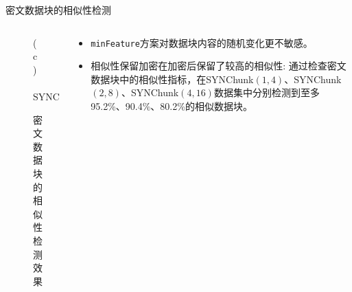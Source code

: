 \documentclass{beamer}
\begin{document}
\begin{frame}{密文数据块的相似性检测}
\begin{columns}
\begin{column}{.5\textwidth}
\begin{figure}[!htb]
                \vspace{-3pt}
                \mbox{\fontsize{8.0pt}{\baselineskip}\selectfont (c) $\textrm{SYNChunk}(4, 16)$}                                                       \\
                \vspace{-3pt}
                \caption{密文数据块的相似性检测效果}
                \label{fig:featurespy-expDetectionSynDetect}
            \end{figure}
        \end{column}
        \begin{column}{.5\textwidth}
            \begin{itemize}
                \item {\tt minFeature}方案对数据块内容的随机变化更不敏感。
                \item 相似性保留加密在加密后保留了较高的相似性: 通过检查密文数据块中的相似性指标，在SYNChunk$(1,4)$、SYNChunk$(2,8)$、SYNChunk$(4,16)$数据集中分别检测到至多95.2\%、90.4\%、80.2\%的相似数据块。
            \end{itemize}
        \end{column}
    \end{columns}
\end{frame}
\end{document}

